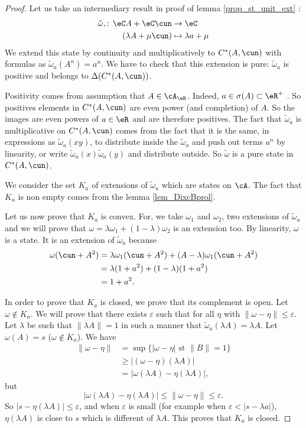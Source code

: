 \begin{proof}
Let us take an intermediary result in proof of lemma \ref{prop_st_unit_ext} :
\begin{equation}
\begin{aligned}
 \tilde\omega,:\,\eC A+\eC\cun&\to \eC \\ 
(\lambda A+\mu\cun)&\mapsto \lambda a+\mu 
\end{aligned}
\end{equation}
We extend this state by continuity and multiplicatively to $C^*(A,\cun)$ with formulas as $\tilde\omega_a(A^n)=a^n$. We have to check that this extension is pure: $\tilde\omega_a$ is positive and belongs to $\Delta(C^*(A,\cun))$. 

Positivity comes from assumption that $A\in\cA_{\eR}$. Indeed, $a\in\sigma(A)\subset\eR^+$ . So positives elements in $C^*(A,\cun)$ are even power (and completion) of $A$. So the images are even powers of  $a\in\eR$ and are therefore positives. 
The fact that $\tilde\omega_a$ is multiplicative on $C^*(A,\cun)$ comes from the fact that it is the same, in expressions as 
$\tilde\omega_a(xy)$, to distribute inside the $\tilde\omega_a$ and push out terms $a^n$ by linearity, or write $\tilde\omega_a(x)\tilde\omega_a(y)$ and distribute outside. So $\tilde\omega$ is a pure state in $C^*(A,\cun)$.

 We consider the set $K_a$ of extensions of $\tilde\omega_a$ which are states on $\cA$. The fact that $K_a$ is non empty comes from the lemma \ref{lem_DixcBprol}. 

Let us now prove that $K_a$ is convex. For, we take $\omega_1$ and $\omega_2$, two extensions of $\tilde\omega_a$ and we will prove that $\omega=\lambda\omega_1+(1-\lambda)\omega_2$ is an extension too. By linearity, $\omega$ is a state. It is an extension of $\tilde\omega_a$ because
\[ 
\begin{split}
\omega(\cun+A^2)&=\lambda\omega_1(\cun+A^2)+(A-\lambda)\omega_1(\cun+A^2)\\
        &=\lambda(1+a^2)+(1-\lambda)(1+a^2)\\
        &=1+a^2.
\end{split}  
\]

 In order to prove that $K_a$ is closed, we prove that its complement is open. Let $\omega\notin K_a$. We will prove that there exists $\varepsilon$ such that for all $\eta$ with $\| \omega-\eta \|\leq\varepsilon$. Let $\lambda$ be such that $\| \lambda A \|=1$ in such a manner that $\tilde\omega_a(\lambda A)=\lambda A$. Let $\omega(A)=s$ ($\omega\notin K_a$). We have
\[ 
\begin{split}
\| \omega-\eta \|&=\sup\{ | \omega-\eta |\text{ st } \| B \|=1 \}\\
        &\geq | (\omega-\eta)(\lambda A) |\\
        &=| \omega(\lambda A)-\eta(\lambda A) |,
\end{split}  
\]
but
\[ 
  | \omega(\lambda A)-\eta(\lambda A) |\leq \| \omega-\eta \|\leq\varepsilon.
\]
So $| s-\eta(\lambda A) |\leq \varepsilon$, and when $\varepsilon$ is small (for example when $\varepsilon<| s-\lambda a |$), $\eta(\lambda A)$ is close to $s$ which is different of $\lambda A$. This proves that $K_a$ is closed.


\end{proof}
